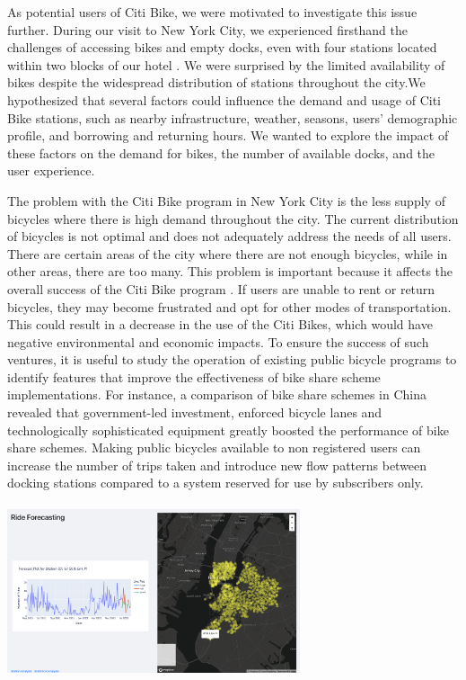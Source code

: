 \documentclass[journal]{vgtc}                     %
\begin{document}
 As potential users of Citi Bike, we were motivated to investigate this issue further. During our visit to New York City, we experienced firsthand the challenges of accessing bikes and empty docks, even with four stations located within two blocks of our hotel \cite{M}. We were surprised by the limited availability of bikes despite the widespread distribution of stations throughout the city.We hypothesized that several factors could influence the demand and usage of Citi Bike stations, such as nearby infrastructure, weather, seasons, users' demographic profile, and borrowing and returning hours. We wanted to explore the impact of these factors on the demand for bikes, the number of available docks, and the user experience.

 
The problem with the Citi Bike program in New York City is the less supply of bicycles where there is high demand throughout the city. The current distribution of bicycles is not optimal and does not adequately address the needs of all users. There are certain areas of the city where there are not enough bicycles, while in other areas, there are too many. This problem is important because it affects the overall success of the Citi Bike program \cite{Meng}. If users are unable to rent or return bicycles, they may become frustrated and opt for other modes of transportation. This could result in a decrease in the use of the Citi Bikes, which would have negative environmental and economic impacts. To ensure the success of such ventures, it is useful to study the operation of existing public bicycle programs to identify features that improve the effectiveness of bike share scheme implementations. For instance, a comparison of bike share schemes in China revealed that government-led investment, enforced bicycle lanes and technologically sophisticated equipment greatly boosted the performance of bike share schemes\cite{Zhao J}. Making public bicycles available to non registered users can increase the number of trips taken and introduce new flow patterns between docking stations compared to a system reserved for use by subscribers only.

\parbox{\linewidth}{
        \includegraphics[width=3.4in, height=2in]{figs/ride.png}\\
        }
        
\end{document}
